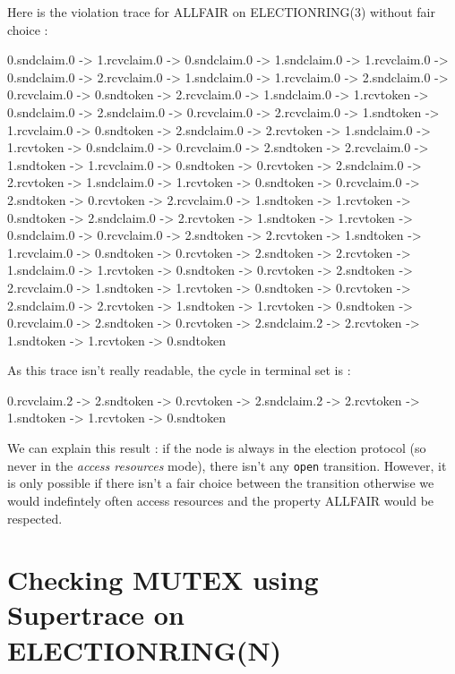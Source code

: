 \documentclass{article}
\begin{document}
Here is the violation trace for ALLFAIR on ELECTIONRING(3) without fair choice :

\begin{spverbatim}
0.sndclaim.0 -> 1.rcvclaim.0  -> 0.sndclaim.0 -> 1.sndclaim.0 -> 1.rcvclaim.0 -> 0.sndclaim.0 -> 2.rcvclaim.0 -> 1.sndclaim.0 -> 1.rcvclaim.0 -> 2.sndclaim.0 -> 0.rcvclaim.0 -> 0.sndtoken -> 2.rcvclaim.0 -> 1.sndclaim.0 -> 1.rcvtoken -> 0.sndclaim.0 -> 2.sndclaim.0 -> 0.rcvclaim.0 -> 2.rcvclaim.0 -> 1.sndtoken -> 1.rcvclaim.0 -> 0.sndtoken -> 2.sndclaim.0 -> 2.rcvtoken -> 1.sndclaim.0 -> 1.rcvtoken -> 0.sndclaim.0 -> 0.rcvclaim.0 -> 2.sndtoken -> 2.rcvclaim.0 -> 1.sndtoken -> 1.rcvclaim.0 -> 0.sndtoken -> 0.rcvtoken -> 2.sndclaim.0 -> 2.rcvtoken -> 1.sndclaim.0 -> 1.rcvtoken -> 0.sndtoken -> 0.rcvclaim.0 -> 2.sndtoken -> 0.rcvtoken -> 2.rcvclaim.0 -> 1.sndtoken -> 1.rcvtoken -> 0.sndtoken -> 2.sndclaim.0 -> 2.rcvtoken -> 1.sndtoken -> 1.rcvtoken -> 0.sndclaim.0 -> 0.rcvclaim.0 -> 2.sndtoken -> 2.rcvtoken -> 1.sndtoken -> 1.rcvclaim.0 -> 0.sndtoken -> 0.rcvtoken -> 2.sndtoken -> 2.rcvtoken -> 1.sndclaim.0 -> 1.rcvtoken -> 0.sndtoken -> 0.rcvtoken -> 2.sndtoken -> 2.rcvclaim.0 -> 1.sndtoken -> 1.rcvtoken -> 0.sndtoken -> 0.rcvtoken -> 2.sndclaim.0 -> 2.rcvtoken -> 1.sndtoken -> 1.rcvtoken -> 0.sndtoken -> 0.rcvclaim.0 -> 2.sndtoken -> 0.rcvtoken -> 2.sndclaim.2 -> 2.rcvtoken -> 1.sndtoken -> 1.rcvtoken -> 0.sndtoken
\end{spverbatim}
\bigskip

As this trace isn't really readable, the cycle in terminal set is : \newline

\begin{spverbatim}
0.rcvclaim.2 -> 2.sndtoken -> 0.rcvtoken -> 2.sndclaim.2 -> 2.rcvtoken -> 1.sndtoken -> 1.rcvtoken -> 0.sndtoken
\end{spverbatim}
\bigskip

We can explain this result : if the node is always in the election protocol (so never in the \textit{access resources} mode), there isn't any \verb#open# transition. However, it is only possible if there isn't a fair choice between the transition otherwise we would indefintely often access resources and the property ALLFAIR would be respected.



\section{Checking MUTEX using Supertrace on ELECTIONRING(N)}

\end{document}
